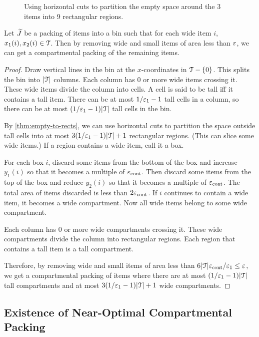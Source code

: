 \begin{figure}[htb]
\centering

\caption{Using horizontal cuts to partition the empty space
around the 3 items into 9 rectangular regions.}
\label{fig:thin-bp:empty-space-to-rects}
\end{figure}

\begin{lemma}
\label{thm:thin-bp:compartmentalize}
Let $\widetilde{J}$ be a packing of items into a bin such that for each wide item $i$,
$x_1(i), x_2(i) \in \mathcal{T}$. Then by removing wide and small items of area less than $\varepsilon$,
we can get a compartmental packing of the remaining items.
\end{lemma}
\begin{proof}
Draw vertical lines in the bin at the $x$-coordinates in $\mathcal{T} - \{0\}$.
This splits the bin into $|\mathcal{T}|$ columns.
Each column has 0 or more wide items crossing it.
These wide items divide the column into cells.
A cell is said to be tall iff it contains a tall item.
There can be at most $1/\varepsilon_1-1$ tall cells in a column,
so there can be at most $(1/\varepsilon_1 - 1)|\mathcal{T}|$ tall cells in the bin.

By \cref{thm:empty-to-rects}, we can use horizontal cuts to partition the space outside
tall cells into at most $3(1/\varepsilon_1-1)|\mathcal{T}| + 1$ rectangular regions.
(This can slice some wide items.)
If a region contains a wide item, call it a box.

For each box $i$, discard some items from the bottom of the box
and increase $y_1(i)$ so that it becomes a multiple of $\varepsilon_{\mathrm{cont}}$.
Then discard some items from the top of the box
and reduce $y_2(i)$ so that it becomes a multiple of $\varepsilon_{\mathrm{cont}}$.
The total area of items discarded is less than $2\varepsilon_{\mathrm{cont}}$.
If $i$ continues to contain a wide item, it becomes a wide compartment.
Now all wide items belong to some wide compartment.

Each column has 0 or more wide compartments crossing it.
These wide compartments divide the column into rectangular regions.
Each region that contains a tall item is a tall compartment.

Therefore, by removing wide and small items of area less than
$6|\mathcal{T}|\varepsilon_{\mathrm{cont}}/\varepsilon_1 \le \varepsilon$, we get a compartmental packing of items
where there are at most $(1/\varepsilon_1-1)|\mathcal{T}|$ tall compartments
and at most $3(1/\varepsilon_1-1)|\mathcal{T}| + 1$ wide compartments.
\end{proof}

\subsection{Existence of Near-Optimal Compartmental Packing}

